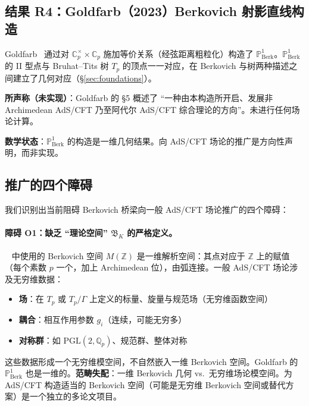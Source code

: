 \documentclass[11pt,a4paper]{ctexart}
\theoremstyle{remark}
\newcommand{\Qp}{\mathbb{Q}_p}
\newcommand{\Cp}{\mathbb{C}_p}
\newcommand{\PoneBerk}{\mathbb{P}^1_{\mathrm{Berk}}}
\newcommand{\Tp}{T_p}
\newcommand{\PGL}{\mathrm{PGL}}
\newcommand{\BirTits}{Bruhat--Tits}
\begin{document}
\subsection{结果 R4：Goldfarb（2023）Berkovich 射影直线构造}
\label{sec:goldfarb}

Goldfarb~\cite{G23} 通过对 $\Cp^\times \times \Cp$ 施加等价关系（经弦距离粗粒化）构造了 $\PoneBerk$。$\PoneBerk$ 的 II 型点与 \BirTits{} 树 $T_p$ 的顶点一一对应，在 Berkovich 与树两种描述之间建立了几何对应（\S\ref{sec:foundations}）。

\textbf{所声称（未实现）}：Goldfarb 的 \S5 概述了 ``一种由本构造所开启、发展非 Archimedean AdS/CFT 乃至阿代尔 AdS/CFT 综合理论的方向''。未进行任何场论计算。

\textbf{数学状态}：$\PoneBerk$ 的构造是一维几何结果。向 AdS/CFT 场论的推广是方向性声明，而非实现。

\subsection{推广的四个障碍}
\label{sec:obstacles}

我们识别出当前阻碍 Berkovich 桥梁向一般 AdS/CFT 场论推广的四个障碍：

\paragraph{障碍 O1：缺乏 ``理论空间'' $\mathfrak{B}_K$ 的严格定义。}
~\cite{HMS20} 中使用的 Berkovich 空间 $M(\mathbb{Z})$ 是一维解析空间：其点对应于 $\mathbb{Z}$ 上的赋值（每个素数 $p$ 一个，加上 Archimedean 位），由弧连接。一般 AdS/CFT 场论涉及无穷维数据：
\begin{itemize}[leftmargin=2em]
    \item \textbf{场}：在 $\Tp$ 或 $\Tp/\Gamma$ 上定义的标量、旋量与规范场（无穷维函数空间）
    \item \textbf{耦合}：相互作用参数 $g_i$（连续，可能无穷多）
    \item \textbf{对称群}：如 $\PGL(2, \Qp)$、规范群、整体对称
\end{itemize}
这些数据形成一个无穷维模空间，不自然嵌入一维 Berkovich 空间。Goldfarb 的 $\PoneBerk$ 也是一维的。\textbf{范畴失配}：一维 Berkovich 几何 vs.\ 无穷维场论模空间。为 AdS/CFT 构造适当的 Berkovich 空间（可能是无穷维 Berkovich 空间或替代方案）是一个独立的多论文项目。
\end{document}
